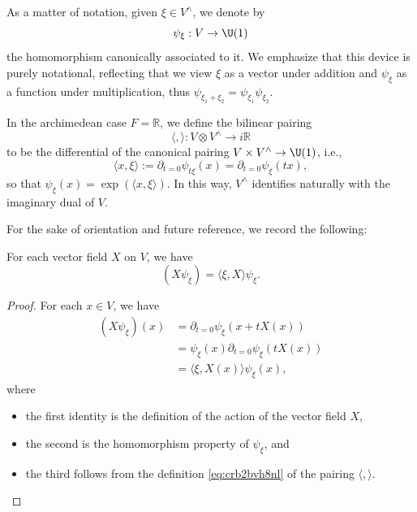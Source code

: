 As a matter of notation, given $\xi \in V^\wedge$, we denote by 
\begin{equation*}
  \psi_\xi : V \rightarrow \U(1)
\end{equation*}
the homomorphism canonically associated to it.  We emphasize that this device is purely notational, reflecting that we view $\xi$ as a vector under addition and $\psi_\xi$ as a function under multiplication, thus $\psi_{\xi_1 + \xi_2} = \psi_{\xi_1} \psi_{\xi_2}$.

In the archimedean case $F = \mathbb{R}$, we define the bilinear pairing
\begin{equation*}
  \langle ,  \rangle : V \otimes V^\wedge \rightarrow i \mathbb{R}
\end{equation*}
to be the differential of the canonical pairing $V \times V^\wedge \rightarrow \U(1)$, i.e.,
\begin{equation}\label{eq:crb2bvh8nl}
  \langle x, \xi  \rangle := \partial_{t=0} \psi_{t \xi}(x) = \partial_{t=0} \psi_{\xi}(t x),
\end{equation}
so that $\psi_{\xi}(x) = \exp(\langle x, \xi  \rangle)$.  In this way, $V^\wedge$ identifies naturally with the imaginary dual of $V$.

For the sake of orientation and future reference, we record the following:
\begin{lemma}\label{lemma:crb2bvqn54}
  For each vector field $X$ on $V$, we have
  \begin{equation*}
    (X \psi_{\xi}) = \langle \xi, X \rangle \psi_{\xi}.
  \end{equation*}
\end{lemma}
\begin{proof}
  For each $x \in V$, we have
  \begin{align*}
    (X \psi_{\xi})(x)
    &=
      \partial_{t = 0} \psi_{\xi}(x + t X(x)) \\
    &=
      \psi_{\xi}(x)
      \partial_{t = 0} \psi_{\xi}(t X(x)) \\
    &=
      \langle \xi, X(x) \rangle
      \psi_{\xi}(x),
  \end{align*}
  where
  \begin{itemize}
  \item the first identity is the definition of the action of the vector field $X$,
  \item the second is the homomorphism property of $\psi_{\xi}$, and
  \item the third follows from the definition \eqref{eq:crb2bvh8nl} of the pairing $\langle , \rangle$.
  \end{itemize}
\end{proof}



